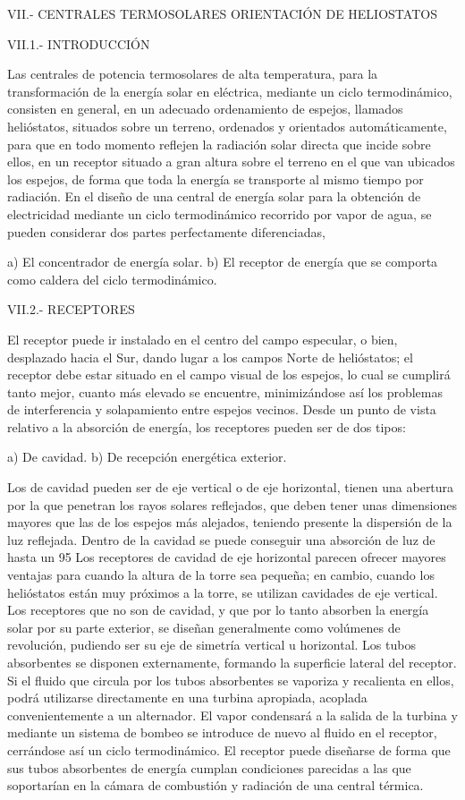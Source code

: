 \documentclass[12pt]{article}
\begin{document}
VII.- CENTRALES TERMOSOLARES
ORIENTACIÓN DE HELIOSTATOS

VII.1.- INTRODUCCIÓN

Las centrales de potencia termosolares de alta temperatura, para la transformación de la energía solar en eléctrica, mediante un ciclo termodinámico, consisten en general, en un adecuado ordenamiento de espejos, llamados helióstatos, situados sobre un terreno, ordenados y orientados automáticamente, para que en todo momento reflejen la radiación solar directa que incide sobre ellos, en un receptor situado a gran altura sobre el terreno en el que van ubicados los espejos, de forma que toda la energía se transporte al mismo tiempo por radiación.
En el diseño de una central de energía solar para la obtención de electricidad mediante un ciclo termodinámico recorrido por vapor de agua, se pueden considerar dos partes perfectamente diferenciadas,

a) El concentrador de energía solar.
b) El receptor de energía que se comporta como caldera del ciclo termodinámico.

VII.2.- RECEPTORES

El receptor puede ir instalado en el centro del campo especular, o bien, desplazado hacia el Sur, dando lugar a los campos Norte de helióstatos; el receptor debe estar situado en el campo visual de los espejos, lo cual se cumplirá tanto mejor, cuanto más elevado se encuentre, minimizándose así los problemas de interferencia y solapamiento entre espejos vecinos.
Desde un punto de vista relativo a la absorción de energía, los receptores pueden ser de dos tipos:

a) De cavidad.
b) De recepción energética exterior.

Los de cavidad pueden ser de eje vertical o de eje horizontal, tienen una abertura por la que penetran los rayos solares reflejados, que deben tener unas dimensiones mayores que las de los espejos más alejados, teniendo presente la dispersión de la luz reflejada. Dentro de la cavidad se puede conseguir una absorción de luz de hasta un 95%
Los receptores de cavidad de eje horizontal parecen ofrecer mayores ventajas para cuando la altura de la torre sea pequeña; en cambio, cuando los helióstatos están muy próximos a la torre, se utilizan cavidades de eje vertical.
Los receptores que no son de cavidad, y que por lo tanto absorben la energía solar por su parte exterior, se diseñan generalmente como volúmenes de revolución, pudiendo ser su eje de simetría vertical u horizontal. Los tubos absorbentes se disponen externamente, formando la superficie lateral del receptor.
Si el fluido que circula por los tubos absorbentes se vaporiza y recalienta en ellos, podrá utilizarse directamente en una turbina apropiada, acoplada convenientemente a un alternador.
El vapor condensará a la salida de la turbina y mediante un sistema de bombeo se introduce de nuevo al fluido en el receptor, cerrándose así un ciclo termodinámico.
El receptor puede diseñarse de forma que sus tubos absorbentes de energía cumplan condiciones parecidas a las que soportarían en la cámara de combustión y radiación de una central térmica.
\end{document}
